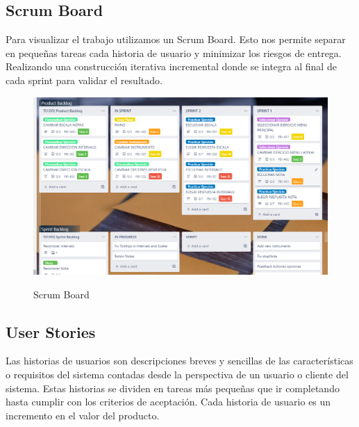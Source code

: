 \documentclass[12pt,twoside,titlepage]{report}
\begin{document}
\subsection{Scrum Board}

Para visualizar el trabajo utilizamos un Scrum Board. Esto nos permite separar en pequeñas tareas cada historia de usuario y minimizar los riesgos de entrega. Realizando una construcción iterativa incremental donde se integra al final de cada sprint para validar el resultado. 

\begin{figure}[H]
    \centering
    \includegraphics[scale=0.47]{Scrum/ScrumBoard}
    \label{fig:ScrumBoard}
    \caption{Scrum Board}
\end{figure}

\subsection{User Stories}

Las historias de usuarios son descripciones breves y sencillas de las características o requisitos del sistema contadas desde la perspectiva de un usuario o cliente del sistema. Estas historias se dividen en tareas más pequeñas que ir completando hasta cumplir con los criterios de aceptación. Cada historia de usuario es un incremento en el valor del producto.
\end{document}
